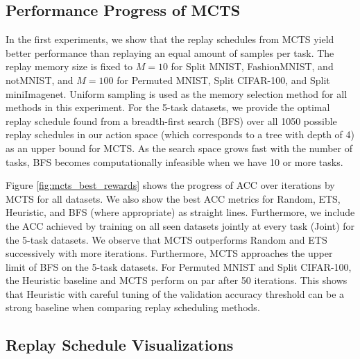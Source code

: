 %
\subsection{Performance Progress of MCTS}\label{paperC:sec:results_with_mcts}

In the first experiments, we show that the replay schedules from MCTS yield better performance than replaying an equal amount of samples per task. 
The replay memory size is fixed to $M=10$ for Split MNIST, FashionMNIST, and notMNIST, and $M=100$ for Permuted MNIST, Split CIFAR-100, and Split miniImagenet. Uniform sampling is used as the memory selection method for all methods in this experiment.
For the 5-task datasets, we provide the optimal replay schedule found from a breadth-first search (BFS) over all 1050 possible replay schedules in our action space (which corresponds to a tree with depth of 4) as an upper bound for MCTS. As the search space grows fast with the number of tasks, BFS becomes computationally infeasible when we have 10 or more tasks.


Figure \ref{fig:mcts_best_rewards} shows the progress of ACC over %
iterations by MCTS for all datasets. We also show the best ACC metrics for Random, ETS, Heuristic, and BFS (where appropriate) as straight lines. 
Furthermore, we include the ACC achieved by training on all seen datasets jointly at every task (Joint) for the 5-task datasets.
We observe that MCTS outperforms Random and ETS successively with more iterations. Furthermore, MCTS approaches the upper limit of BFS on the 5-task datasets. For Permuted MNIST and Split CIFAR-100, the Heuristic baseline and MCTS perform on par after 50 iterations. This shows that Heuristic with careful tuning of the validation accuracy threshold can be a strong baseline when comparing replay scheduling methods. %


%
\subsection{Replay Schedule Visualizations}
\label{paperC:sec:replay_schedule_visualization}

